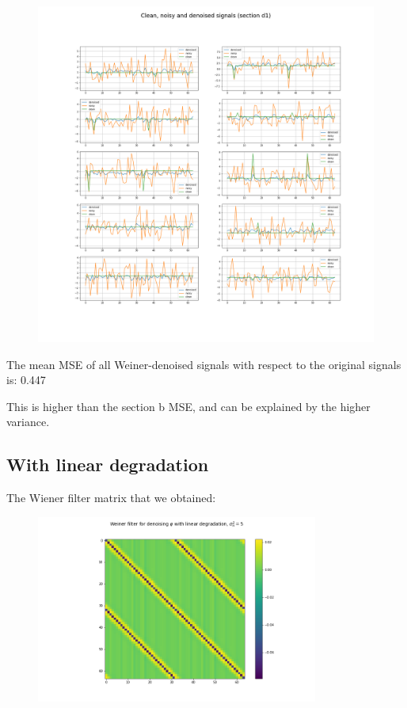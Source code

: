 \documentclass[a4paper]{article}
\begin{document}
\begin{figure}[h]
    \centering
    \includegraphics[width=500,keepaspectratio]{samples_d_1.png}
\end{figure}

The mean MSE of all Weiner-denoised signals with respect to the original signals is: 0.447

This is higher than the section b MSE, and can be explained by the higher variance.

\newpage

\subsection*{With linear degradation}

The Wiener filter matrix that we obtained:

\begin{figure}[h]
    \centering
    \includegraphics[width=350,keepaspectratio]{p2q1d_weiner_two.png}
\end{figure}
\end{document}
